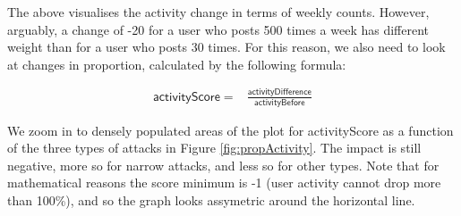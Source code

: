 \documentclass[10pt,]{scrartcl}
\begin{document}
The above visualises the activity change in terms of weekly counts.
However, arguably, a change of -20 for a user who posts 500 times a week
has different weight than for a user who posts 30 times. For this
reason, we also need to look at changes in proportion, calculated by the
following formula:

\begin{align}
\mathsf{activityScore} = & \frac{\mathsf{activityDifference}}{\mathsf{activityBefore}}
\end{align}

We zoom in to densely populated areas of the plot for
\textsf{activityScore} as a function of the three types of attacks in
Figure \ref{fig:propActivity}. The impact is still negative, more so for
\textsf{narrow} attacks, and less so for other types. Note that for
mathematical reasons the score minimum is -1 (user activity cannot drop
more than 100\%), and so the graph looks assymetric around the
horizontal line.

\footnotesize
\end{document}
